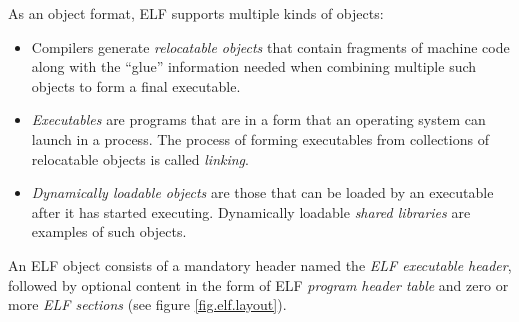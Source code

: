 \documentclass[a4paper,pdftex]{book}
\newcommand{\firstterm}[1]{\textit{#1}}
\begin{document}
As an object format, ELF supports multiple kinds of objects:

\begin{itemize}
\item Compilers generate \firstterm{relocatable
  objects} that contain fragments of
  machine code along with the ``glue'' information needed when
  combining multiple such objects to form a final executable.
\item \firstterm{Executables} are programs that are
  in a form that an operating system can launch in a process.  The
  process of forming executables from collections of relocatable
  objects is called \firstterm{linking}.
\item \firstterm{Dynamically loadable objects} are those that can be loaded by an executable
  after it has started executing.  Dynamically loadable
  \firstterm{shared libraries} are examples of
  such objects.
\end{itemize}

An ELF object consists of a mandatory header named the \firstterm{ELF
  executable header}, followed by optional
content in the form of ELF \firstterm{program header table}
 and zero or more \firstterm{ELF
  sections} (see figure \vref{fig.elf.layout}).
\end{document}
